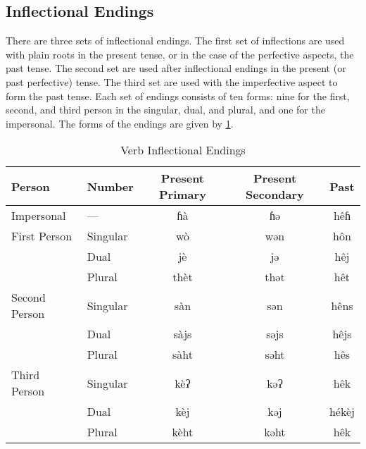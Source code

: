 \subsection{Inflectional Endings}
There are three sets of inflectional endings. The first set of inflections are
used with plain roots in the present tense, or in the case of the perfective
aspects, the past tense. The second set are used after inflectional endings in
the present (or past perfective) tense. The third set are used with the
imperfective aspect to form the past tense. Each set of endings consists of ten
forms: nine for the first, second, and third person in the singular, dual, and
plural, and one for the impersonal. The forms of the endings are given by
\cref{tab:verb inflectional endings}.

\begin{table}[h]
\centering
\caption{Verb Inflectional Endings}
\label{tab:verb inflectional endings}
\begin{tabular}{ll*{3}{>{\ll}c}}
    \toprule
    Person & Number & \rm \parbox{2cm}{\centering Present Primary} & \rm
    \parbox{2cm}{\centering Present Secondary} & \rm Past \\ \midrule
    Impersonal    & —        & ɦà   & ɦə   & hêɦ   \\ \midrule
    First Person  & Singular & wò   & wən  & hôn   \\
                  & Dual     & jè   & jə   & hêj   \\
                  & Plural   & thèt & thət & hêt   \\ \midrule
    Second Person & Singular & sàn  & sən  & hêns  \\
                  & Dual     & sàjs & səjs & hêjs  \\
                  & Plural   & sàht & səht & hês   \\ \midrule
    Third Person  & Singular & kèʔ  & kəʔ  & hêk   \\
                  & Dual     & kèj  & kəj  & hékèj \\
                  & Plural   & kèht & kəht & hêk   \\
    \bottomrule
\end{tabular}
\end{table}

